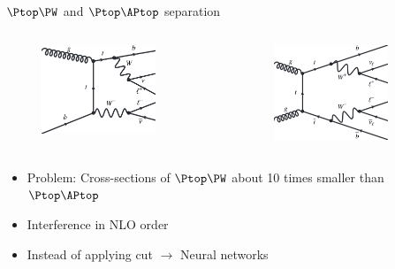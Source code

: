 \documentclass[12pt]{beamer}
\begin{document}
\begin{frame}{$\Ptop\PW$ and $\Ptop\APtop$ separation}
    \begin{columns}
    \begin{column}{0.5\textwidth}
        \begin{figure}
            \centering
            \includegraphics[width = 0.8\textwidth]{tw.png}
        \end{figure}
        \end{column}
        \begin{column}{0.5\textwidth}
        \begin{figure}
            \centering
            \includegraphics[width = 0.8\textwidth]{tt.png}
        \end{figure}
    \end{column}
\end{columns}
\begin{itemize}
    \item Problem: Cross-sections of $\Ptop\PW$ about 10 times smaller than $\Ptop\APtop$
    \item Interference in NLO order
    \item Instead of applying cut $\longrightarrow$ Neural networks
\end{itemize}
\end{frame}
\end{document}
